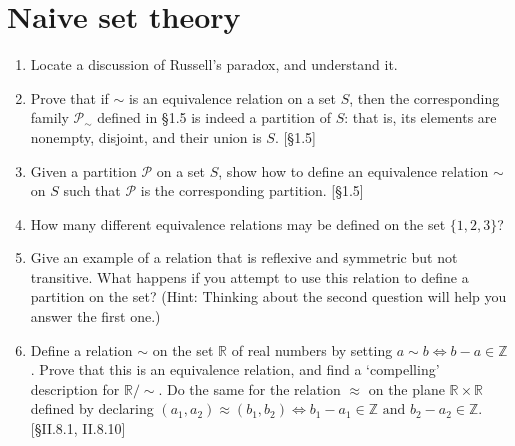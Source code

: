 \section{Naive set theory}
\begin{enumerate}
    \item Locate a discussion of Russell's paradox, and understand it.

    \item Prove that if $\sim$ is an equivalence relation on a set $S$, then the corresponding family $\mathcal{P}_{\sim}$ defined in \S1.5 is indeed a partition of $S$: that is, its elements are nonempty, disjoint, and their union is $S$. [\S1.5]

    \item Given a partition $\mathcal{P}$ on a set $S$, show how to define an equivalence relation $\sim$ on $S$ such that $\mathcal{P}$ is the corresponding partition. [\S1.5]

    \item How many different equivalence relations may be defined on the set $\{1, 2, 3\}$?

    \item Give an example of a relation that is reflexive and symmetric but not transitive. What happens if you attempt to use this relation to define a partition on the set? (Hint: Thinking about the second question will help you answer the first one.)

    \item Define a relation $\sim$ on the set $\mathbb{R}$ of real numbers by setting $a \sim b \iff b-a \in \mathbb{Z}$. Prove that this is an equivalence relation, and find a `compelling' description for $\mathbb{R}/\sim$. Do the same for the relation $\approx$ on the plane $\mathbb{R} \times \mathbb{R}$ defined by declaring $(a_1, a_2) \approx (b_1, b_2) \iff b_1 - a_1 \in \mathbb{Z} \text{ and } b_2 - a_2 \in \mathbb{Z}$. [\S II.8.1, II.8.10]
\end{enumerate}
